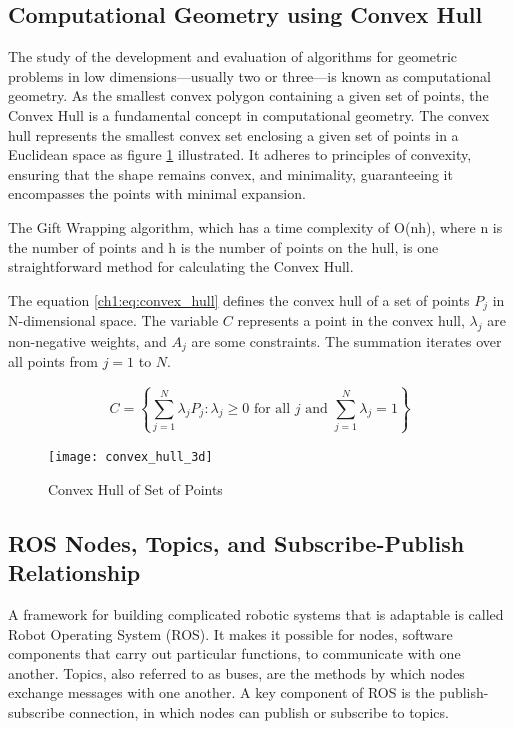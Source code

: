 \subsection{Computational Geometry using Convex Hull}
The study of the development and evaluation of algorithms for geometric problems in low dimensions—usually two or three—is known as computational geometry. As the smallest convex polygon containing a given set of points, the Convex Hull is a fundamental concept in computational geometry. The convex hull represents the smallest convex set enclosing a given set of points in a Euclidean space as figure \ref{ch1:fig:convex_hull_theory} illustrated. It adheres to principles of convexity, ensuring that the shape remains convex, and minimality, guaranteeing it encompasses the points with minimal expansion.

The Gift Wrapping algorithm, which has a time complexity of O(nh), where n is the number of points and h is the number of points on the hull, is one straightforward method for calculating the Convex Hull.

The equation \ref{ch1:eq:convex_hull} defines the convex hull of a set of points $P_j$ in N-dimensional space. The variable $C$ represents a point in the convex hull, $\lambda_j$ are non-negative weights, and $A_j$ are some constraints. The summation iterates over all points from $j=1$ to $N$.

\begin{equation}
	\label{ch1:eq:convex_hull}
	C = \left\{ \sum_{j=1}^{N} \lambda_j P_j: \lambda_j \geq 0 \text{ for all } j \text{ and } \sum_{j=1}^{N} \lambda_j = 1 \right\}
\end{equation}




\begin{figure}[H]
	\centering
	\texttt{[image: convex\_hull\_3d]}
	\caption{Convex Hull of Set of Points}
	\label{ch1:fig:convex_hull_theory}
\end{figure}

\subsection{ROS Nodes, Topics, and Subscribe-Publish Relationship}
A framework for building complicated robotic systems that is adaptable is called Robot Operating System (ROS). It makes it possible for nodes, software components that carry out particular functions, to communicate with one another. Topics, also referred to as buses, are the methods by which nodes exchange messages with one another. A key component of ROS is the publish-subscribe connection, in which nodes can publish or subscribe to topics.

